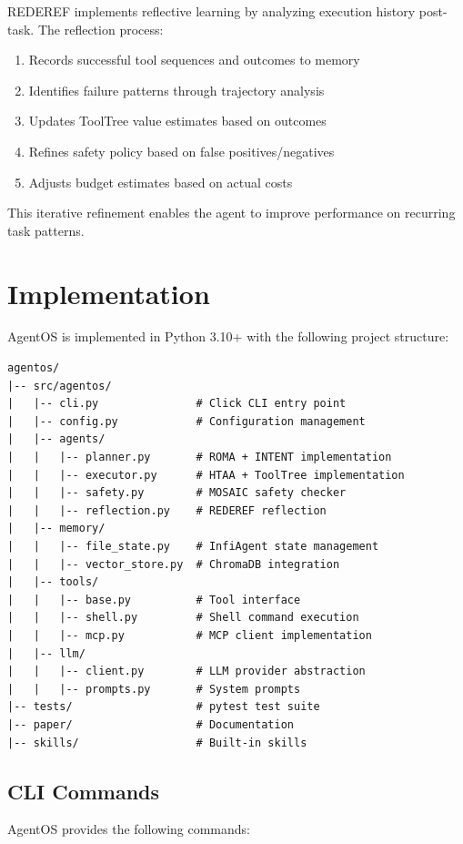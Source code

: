 \documentclass{article}
\begin{document}
REDEREF implements reflective learning by analyzing execution history post-task. The reflection process:
\begin{enumerate}
    \item Records successful tool sequences and outcomes to memory
    \item Identifies failure patterns through trajectory analysis
    \item Updates ToolTree value estimates based on outcomes
    \item Refines safety policy based on false positives/negatives
    \item Adjusts budget estimates based on actual costs
\end{enumerate}
This iterative refinement enables the agent to improve performance on recurring task patterns.

\section{Implementation}

AgentOS is implemented in Python 3.10+ with the following project structure:

\begin{verbatim}
agentos/
|-- src/agentos/
|   |-- cli.py               # Click CLI entry point
|   |-- config.py            # Configuration management
|   |-- agents/
|   |   |-- planner.py       # ROMA + INTENT implementation
|   |   |-- executor.py      # HTAA + ToolTree implementation
|   |   |-- safety.py        # MOSAIC safety checker
|   |   |-- reflection.py    # REDEREF reflection
|   |-- memory/
|   |   |-- file_state.py    # InfiAgent state management
|   |   |-- vector_store.py  # ChromaDB integration
|   |-- tools/
|   |   |-- base.py          # Tool interface
|   |   |-- shell.py         # Shell command execution
|   |   |-- mcp.py           # MCP client implementation
|   |-- llm/
|   |   |-- client.py        # LLM provider abstraction
|   |   |-- prompts.py       # System prompts
|-- tests/                   # pytest test suite
|-- paper/                   # Documentation
|-- skills/                  # Built-in skills
\end{verbatim}

\subsection{CLI Commands}

AgentOS provides the following commands:
\end{document}
